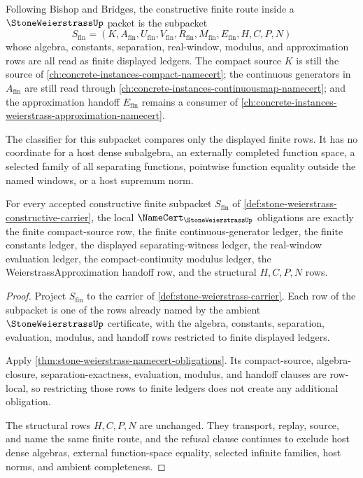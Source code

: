 \begin{definition}
\label{def:stone-weierstrass-constructive-carrier}
Following Bishop and Bridges, the constructive finite route inside a $\StoneWeierstrassUp$ packet is the subpacket
$$
S_{\mathrm{fin}}=(K,A_{\mathrm{fin}},U_{\mathrm{fin}},V_{\mathrm{fin}},R_{\mathrm{fin}},M_{\mathrm{fin}},E_{\mathrm{fin}},H,C,P,N)
$$
whose algebra, constants, separation, real-window, modulus, and approximation rows are all read as finite displayed ledgers. The compact source $K$ is still the source of \autoref{ch:concrete-instances-compact-namecert}; the continuous generators in $A_{\mathrm{fin}}$ are still read through \autoref{ch:concrete-instances-continuousmap-namecert}; and the approximation handoff $E_{\mathrm{fin}}$ remains a consumer of \autoref{ch:concrete-instances-weierstrass-approximation-namecert}.

The classifier for this subpacket compares only the displayed finite rows. It has no coordinate for a host dense subalgebra, an externally completed function space, a selected family of all separating functions, pointwise function equality outside the named windows, or a host supremum norm.
\end{definition}

\begin{theorem}
\label{thm:stone-weierstrass-constructive-namecert-obligations}
For every accepted constructive finite subpacket $S_{\mathrm{fin}}$ of \autoref{def:stone-weierstrass-constructive-carrier}, the local $\NameCert_{\StoneWeierstrassUp}$ obligations are exactly the finite compact-source row, the finite continuous-generator ledger, the finite constants ledger, the displayed separating-witness ledger, the real-window evaluation ledger, the compact-continuity modulus ledger, the WeierstrassApproximation handoff row, and the structural $H,C,P,N$ rows.
\end{theorem}
\begin{proof}
Project $S_{\mathrm{fin}}$ to the carrier of \autoref{def:stone-weierstrass-carrier}. Each row of the subpacket is one of the rows already named by the ambient $\StoneWeierstrassUp$ certificate, with the algebra, constants, separation, evaluation, modulus, and handoff rows restricted to finite displayed ledgers.

Apply \autoref{thm:stone-weierstrass-namecert-obligations}. Its compact-source, algebra-closure, separation-exactness, evaluation, modulus, and handoff clauses are row-local, so restricting those rows to finite ledgers does not create any additional obligation.

The structural rows $H,C,P,N$ are unchanged. They transport, replay, source, and name the same finite route, and the refusal clause continues to exclude host dense algebras, external function-space equality, selected infinite families, host norms, and ambient completeness.
\end{proof}

